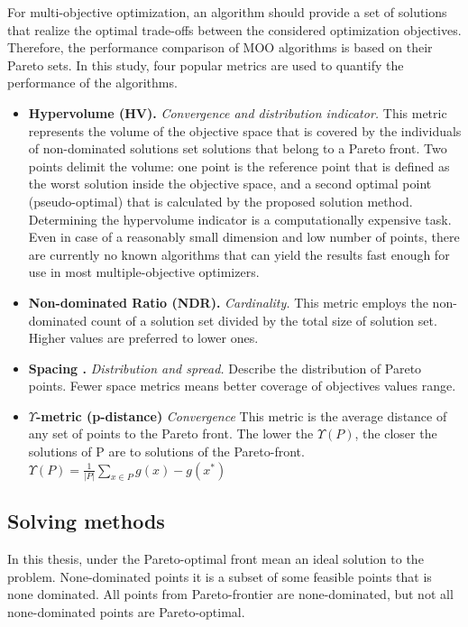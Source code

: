         For multi-objective optimization, an algorithm should provide a set of solutions that realize the optimal trade-offs between the considered optimization objectives. Therefore, the performance comparison of MOO algorithms is based on their Pareto sets. In this study, four popular metrics are used to quantify the performance of the algorithms.
        \begin{itemize}
            \item \textbf{Hypervolume (HV).}\cite{Zitzler2000ComparisonOM} \textit{Convergence and distribution indicator.}
            This metric represents the volume of the objective space that is covered by the individuals of non-dominated solutions set solutions that belong to a Pareto front. Two points delimit the volume: one point is the reference point that is defined as the worst solution inside the objective space, and a second optimal point (pseudo-optimal) that is calculated by the proposed solution method. Determining the hypervolume indicator is a computationally expensive task. Even in case of a reasonably small dimension and low number of points, there are currently no known algorithms that can yield the results fast enough for use in most multiple-objective optimizers.
            \item \textbf{Non-dominated Ratio (NDR).} \textit{Cardinality.} This metric employs the non-dominated count of a solution set divided by the total size of solution set. Higher values are preferred to lower ones.
            \item \textbf{Spacing \cite{Schott1995FaultTD}.} \textit{Distribution and spread.} Describe the distribution of Pareto points. Fewer space metrics means better coverage of objectives values range. 
            \item \textbf{$\Upsilon$-metric (p-distance)}\cite{Martens13} \textit{Convergence} This metric is the average distance of any set of points to the Pareto front. The lower the $\Upsilon (P)$, the closer the solutions of P are to solutions of the Pareto-front. $\Upsilon(P) = \frac{1}{|P|}\sum_{x\in P}g(x)-g(x^*)$ 
            

            
        \end{itemize}
 
        \subsection{Solving methods}
        In this thesis, under the Pareto-optimal front mean an ideal solution to the problem. None-dominated points it is a subset of some feasible points that is none dominated. All points from Pareto-frontier are none-dominated, but not all none-dominated points are Pareto-optimal.

